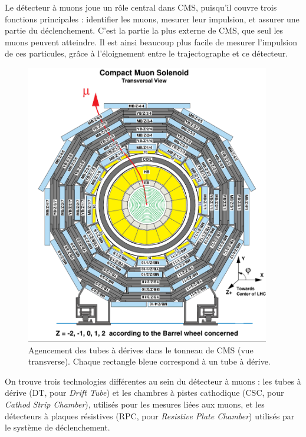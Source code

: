 Le détecteur à muons joue un rôle central dans CMS, puisqu'il couvre trois fonctions principales : identifier les muons, mesurer leur impulsion, et assurer une partie du déclenchement. C'est la partie la plus externe de CMS, que seul les muons peuvent atteindre. Il est ainsi beaucoup plus facile de mesurer l'impulsion de ces particules, grâce à l'éloignement entre le trajectographe et ce détecteur.

\begin{figure}[p] \centering
  \includegraphics[width=0.95\textwidth]{chapitre2/figs/CMS_transverse_view.pdf}
  \caption{Agencement des tubes à dérives dans le tonneau de CMS (vue transverse). Chaque rectangle bleue correspond à un tube à dérive.}
  \label{fig:cms_dt}
\end{figure}

On trouve trois technologies différentes au sein du détecteur à muons : les tubes à dérive (DT, pour \emph{Drift Tube}) et les chambres à pistes cathodique (CSC, pour \emph{Cathod Strip Chamber}), utilisés pour les mesures liées aux muons, et les détecteurs à plaques résistives (RPC, pour \emph{Resistive Plate Chamber}) utilisés par le système de déclenchement.

